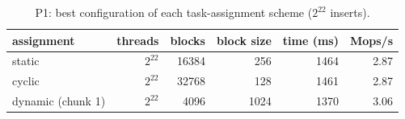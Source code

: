 \begin{table}[H]\centering\small
\caption{P1: best configuration of each task-assignment scheme ($2^{22}$ inserts).}\label{tab:p1sched}
\begin{tabular}{lrrrrr}
\toprule
assignment & threads & blocks & block size & time (ms) & Mops/s \\
\midrule
static & $2^{22}$ & 16384 & 256 & 1464 & 2.87 \\
cyclic & $2^{22}$ & 32768 & 128 & 1461 & 2.87 \\
dynamic (chunk 1) & $2^{22}$ & 4096 & 1024 & 1370 & 3.06 \\
\bottomrule
\end{tabular}
\end{table}
